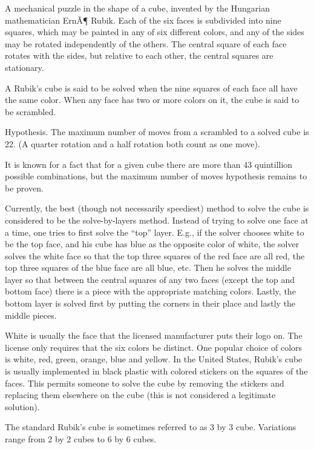 \documentclass[12pt]{article}
\begin{document}
A mechanical puzzle in the shape of a cube, invented by the Hungarian mathematician ErnÃ¶ Rubik. Each of the six faces is subdivided into nine squares, which may be painted in any of six different colors, and any of the sides may be rotated independently of the others. The central square of each face rotates with the sides, but relative to each other, the central squares are stationary.

A Rubik's cube is said to be solved when the nine squares of each face all have the same color. When any face has two or more colors on it, the cube is said to be scrambled.

Hypothesis. The maximum number of moves from a scrambled to a solved cube is 22. (A quarter rotation and a half rotation both count as one move).

It is known for a fact that for a given cube there are more than 43 quintillion possible combinations, but the maximum number of moves hypothesis remains to be proven.

Currently, the best (though not necessarily speediest) method to solve the cube is considered to be the solve-by-layers method. Instead of trying to solve one face at a time, one tries to first solve the ``top'' layer. E.g., if the solver chooses white to be the top face, and his cube has blue as the opposite color of white, the solver solves the white face so that the top three squares of the red face are all red, the top three squares of the blue face are all blue, etc. Then he solves the middle layer so that between the central squares of any two faces (except the top and bottom face) there is a piece with the appropriate matching colors. Lastly, the bottom layer is solved first by putting the corners in their place and lastly the middle pieces.

White is usually the face that the licensed manufacturer puts their logo on. The license only requires that the six colors be distinct. One popular choice of colors is white, red, green, orange, blue and yellow. In the United States, Rubik's cube is usually implemented in black plastic with colored stickers on the squares of the faces. This permits someone to solve the cube by removing the stickers and replacing them elsewhere on the cube (this is not considered a legitimate solution).

The standard Rubik's cube is sometimes referred to as 3 by 3 cube. Variations range from 2 by 2 cubes to 6 by 6 cubes.
\end{document}
